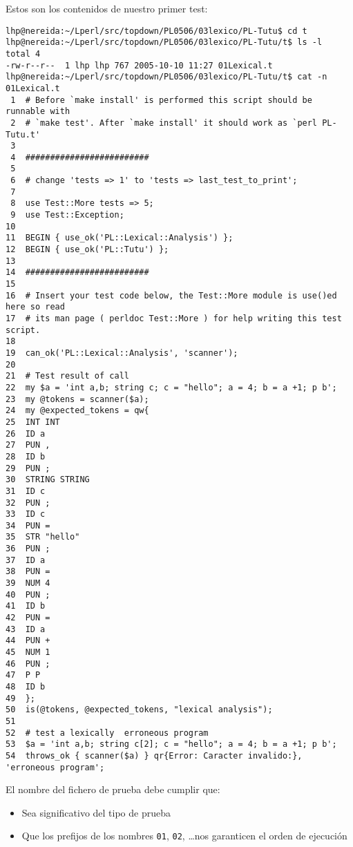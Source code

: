 Estos son los contenidos de nuestro primer test:
\begin{verbatim}
lhp@nereida:~/Lperl/src/topdown/PL0506/03lexico/PL-Tutu$ cd t
lhp@nereida:~/Lperl/src/topdown/PL0506/03lexico/PL-Tutu/t$ ls -l
total 4
-rw-r--r--  1 lhp lhp 767 2005-10-10 11:27 01Lexical.t
lhp@nereida:~/Lperl/src/topdown/PL0506/03lexico/PL-Tutu/t$ cat -n 01Lexical.t
 1  # Before `make install' is performed this script should be runnable with
 2  # `make test'. After `make install' it should work as `perl PL-Tutu.t'
 3
 4  #########################
 5
 6  # change 'tests => 1' to 'tests => last_test_to_print';
 7
 8  use Test::More tests => 5;
 9  use Test::Exception;
10
11  BEGIN { use_ok('PL::Lexical::Analysis') };
12  BEGIN { use_ok('PL::Tutu') };
13
14  #########################
15
16  # Insert your test code below, the Test::More module is use()ed here so read
17  # its man page ( perldoc Test::More ) for help writing this test script.
18
19  can_ok('PL::Lexical::Analysis', 'scanner');
20
21  # Test result of call
22  my $a = 'int a,b; string c; c = "hello"; a = 4; b = a +1; p b';
23  my @tokens = scanner($a);
24  my @expected_tokens = qw{
25  INT INT
26  ID a
27  PUN ,
28  ID b
29  PUN ;
30  STRING STRING
31  ID c
32  PUN ;
33  ID c
34  PUN =
35  STR "hello"
36  PUN ;
37  ID a
38  PUN =
39  NUM 4
40  PUN ;
41  ID b
42  PUN =
43  ID a
44  PUN +
45  NUM 1
46  PUN ;
47  P P
48  ID b
49  };
50  is(@tokens, @expected_tokens, "lexical analysis");
51
52  # test a lexically  erroneous program
53  $a = 'int a,b; string c[2]; c = "hello"; a = 4; b = a +1; p b';
54  throws_ok { scanner($a) } qr{Error: Caracter invalido:}, 'erroneous program';
\end{verbatim}

El nombre del fichero de prueba debe cumplir que:
\begin{itemize}
\item
Sea significativo del tipo de prueba
\item
Que los prefijos de los nombres \verb|01|, \verb|02|, \ldots nos garanticen
el orden de ejecución
\end{itemize}


